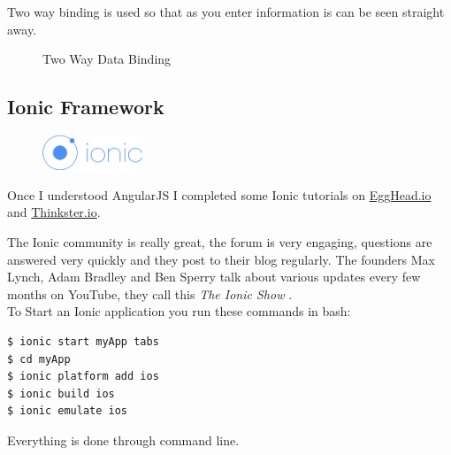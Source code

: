 Two way binding is used so that as you enter information is can be seen straight away.
\begin{figure}[H] 
	\caption{Two Way Data Binding}
	\label{fig:speciation}
\end{figure}

\pagebreak
\subsection{Ionic Framework}
\begin{figure}
	\includegraphics[width=3cm]{img/mobile-app/logos/ionic.png}
\end{figure} 
Once I understood AngularJS I completed some Ionic tutorials on \url{EggHead.io} and \url{Thinkster.io}.

The Ionic \cite{ionic} community is really great, the forum is very engaging, questions are answered very quickly and they post to their blog regularly.
The  founders Max Lynch, Adam Bradley and Ben Sperry talk about various updates every few months on YouTube, they call this \textit{The Ionic Show} \cite{ionic_show}.
\\

To Start an Ionic application you run these commands in bash:
\begin{verbatim}
$ ionic start myApp tabs
$ cd myApp
$ ionic platform add ios
$ ionic build ios
$ ionic emulate ios
\end{verbatim}
Everything is done through command line.
\\

